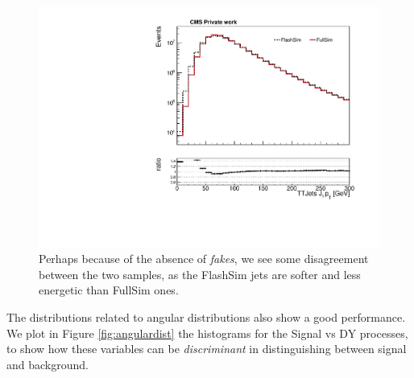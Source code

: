 \begin{figure}
    \centering
    \includegraphics[width=\linewidth]{gfx/ch6/TTJets_J1_pt____log.pdf}
    \caption[J$_1$ $p_T$]{Perhaps because of the absence of \emph{fakes}, we see some disagreement between the two samples, as the FlashSim jets are softer and less energetic than FullSim ones.}
    \label{fig:j1pt}
\end{figure}

The distributions related to angular distributions also show a good performance. We plot in Figure \ref{fig:angulardist} the histograms for the Signal vs DY processes, to show how these variables can be \emph{discriminant} in distinguishing between signal and background.

